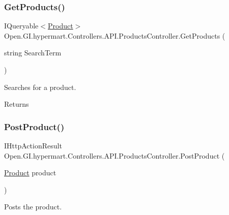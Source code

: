 \subsubsection{\texorpdfstring{Get\+Products()}{GetProducts()}\hspace{0.1cm}{\footnotesize\ttfamily [2/2]}}
{\footnotesize\ttfamily I\+Queryable$<$\hyperlink{class_open_1_1_g_i_1_1hypermart_1_1_models_1_1_product}{Product}$>$ Open.\+G\+I.\+hypermart.\+Controllers.\+A\+P\+I.\+Products\+Controller.\+Get\+Products (\begin{DoxyParamCaption}\item[{string}]{Search\+Term }\end{DoxyParamCaption})}



Searches for a product. 

\begin{DoxyReturn}{Returns}

\end{DoxyReturn}
\hypertarget{class_open_1_1_g_i_1_1hypermart_1_1_controllers_1_1_a_p_i_1_1_products_controller_a0fad687e249ba71420482808c61760e4}{}\label{class_open_1_1_g_i_1_1hypermart_1_1_controllers_1_1_a_p_i_1_1_products_controller_a0fad687e249ba71420482808c61760e4} 
\subsubsection{\texorpdfstring{Post\+Product()}{PostProduct()}}
{\footnotesize\ttfamily I\+Http\+Action\+Result Open.\+G\+I.\+hypermart.\+Controllers.\+A\+P\+I.\+Products\+Controller.\+Post\+Product (\begin{DoxyParamCaption}\item[{\hyperlink{class_open_1_1_g_i_1_1hypermart_1_1_models_1_1_product}{Product}}]{product }\end{DoxyParamCaption})}



Posts the product. 



